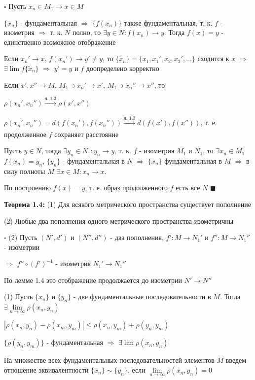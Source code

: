 \documentclass[a4paper]{report}
\begin{document}
\noindent $\square$ Пусть $x_n\in M_1\to x\in M$

$\{x_n\}$ - фундаментальная $\Rightarrow$ $\{f(x_n)\}$ также фундаментальная, т. к. $f$ - изометрия $\Rightarrow$ т. к. 
$N$ полно, то $\exists y\in N\colon f(x_n)\to y$. Тогда $f(x)=y$ - единственно возможное отображение

Если $x_n'\to x$, $f(x_n')\to y'\ne y$, то $\{\tilde x_n\}=\{x_1,x_1',x_2,x_2',\ldots\}$ сходится к $x$ $\Rightarrow$ 
$\exists\lim f\{\tilde x_n\}$ $\Rightarrow$ $y'=y$ и $f$ доопределено корректно

Если $x',x''\to M$, $M_1\ni x_n'\to x'$, $M_1\ni x_n''\to x''$, то 

$\rho(x_n',x_n'')\xrightarrow[]{\text{л. 1.3}}\rho(x',x'')$

$\rho(x_n',x_n'')=d(f(x_n'),f(x_n''))\xrightarrow[]{\text{л. 1.3}}d(f(x'),f(x''))$, т. е. продолженное $f$ сохраняет расстояние

Пусть $y\in N$, тогда $\exists y_n\in N_1\colon y_n\to y$, т. к. $f$ - изометрия $M_1$ и $N_1$, то $\exists x_n\in M_1$ 
$f(x_n)=y_n$, $\{y_n\}$ - фундаментальная в $N$ $\Rightarrow$ $\{x_n\}$ фундаментальная в $M$ $\Rightarrow$ в силу 
полноты $M$ $\exists x\in M\colon x_n\to x$. 

По построению $f(x)=y$, т. е. образ продолженного $f$ есть все $N$ $\blacksquare$
\bigskip

\noindent\textbf{Теорема 1.4:} (1) Для всякого метрического пространства существует пополнение

(2) Любые два пополнения одного метрического пространства изометричны

\noindent $\square$ (2) Пусть $(N',d')$ и $(N'',d'')$ - два пополнения, $f'\colon M\to N_1'$ и $f''\colon M\to N_1''$ - изометрии

$\Rightarrow$ $f''\circ(f')^{-1}$ - изометрия $N_1'\to N_1''$

По лемме 1.4 это отображение продолжается до изометрии $N'\to N''$

(1) Пусть $\{x_n\}$ и $\{y_n\}$ - две фундаментальные последовательности в $M$. Тогда $\exists\lim\limits_{n\to\infty}\rho(x_n,y_n)$

$|\rho(x_n,y_n)-\rho(x_m,y_m)|\le\rho(x_n,y_m)+\rho(y_n,y_m)$

$\{\rho(y_n,y_m)\}$  - фундаментальная $\Rightarrow$ $\exists\lim\rho(x_n,y_n)$

На множестве всех фундаментальных последовательностей элементов $M$ введем отношение эквивалентности $\{x_n\}\sim\{y_n\}$, 
если $\lim\limits_{n\to\infty}\rho(x_n,y_n)=0$
\end{document}
